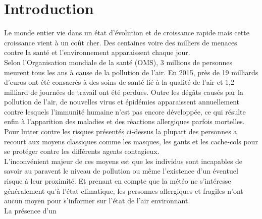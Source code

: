 \chapter*{Introduction}

\qquad Le monde entier vie dans un état d'évolution et de croissance rapide mais cette croissance vient à un coût cher. Des centaines voire des milliers de menaces contre la santé et l'environnement apparaissent chaque jour.\\

Selon l’Organisation mondiale de la santé (OMS), 3 millions de personnes meurent tous les ans à cause de la pollution de l’air. En 2015, près de 19 milliards d’euros ont été consacrés à des soins de santé lié à la qualité de l’air et 1,2 milliard de journées de travail ont été perdues. Outre les dégâts causés par la pollution de l'air, de nouvelles virus et épidémies apparaissent annuellement contre lesquels l'immunité humaine n'est pas encore développée, ce qui résulte enfin à l'apparition des maladies et des réactions allergiques parfois mortelles.\\

Pour lutter contre les risques présentés ci-dessus la plupart des personnes a recourt aux moyens classiques comme les masques, les gants et les cache-cols pour se protéger contre les différents agents contagieux.\\

L'inconvénient majeur de ces moyens est que les individus sont incapables de savoir au paravent le niveau de pollution ou même l'existence d'un éventuel risque à leur proximité. Et prenant en compte que la météo ne s'intéresse généralement qu'à l'état climatique, les personnes allergiques et fragiles n'ont aucun moyen pour s'informer sur l'état de l'air environnant.\\

La présence d'un 
